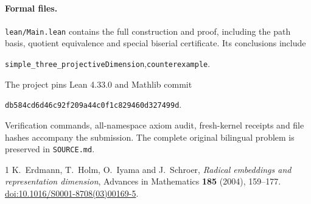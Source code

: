 \documentclass[11pt,a4paper]{article}
\begin{document}
\paragraph{Formal files.}
\texttt{lean/Main.lean} contains the full construction and proof, including
the path basis, quotient equivalence and special biserial certificate.
Its conclusions include
\begin{center}
\small\texttt{simple\_three\_projectiveDimension},\qquad\texttt{counterexample}.
\end{center}
The project pins Lean 4.33.0 and Mathlib commit
\begin{center}
\small\texttt{db584cd6d46c92f209a44c0f1c829460d327499d}.
\end{center}
Verification commands,
all-namespace axiom audit, fresh-kernel receipts and file hashes accompany
the submission. The complete original bilingual problem is preserved in
\texttt{SOURCE.md}.

\begin{thebibliography}{1}
K.~Erdmann, T.~Holm, O.~Iyama and J.~Schroer,
\emph{Radical embeddings and representation dimension},
Advances in Mathematics \textbf{185} (2004), 159--177.
\href{https://doi.org/10.1016/S0001-8708(03)00169-5}{doi:10.1016/S0001-8708(03)00169-5}.
\end{thebibliography}
\end{document}
